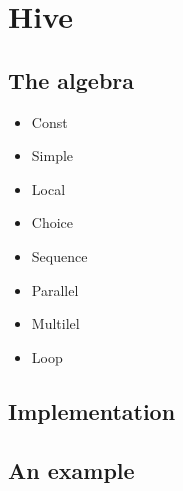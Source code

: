 \chapter{Hive}

\section{The algebra}
\begin{itemize}
  \item Const
  \item Simple
  \item Local
  \item Choice
  \item Sequence
  \item Parallel
  \item Multilel
  \item Loop
\end{itemize}

\section{Implementation}

\section{An example}